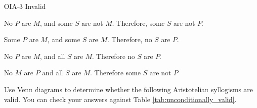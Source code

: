 \begin{exercises}
{ OIA-3 Invalid
}

\item No $P$ are $M$, and some $S$ are not $M$. Therefore, some $S$ are not $P$.

\item Some $P$ are $M$, and some $S$ are $M$. Therefore, no $S$ are $P$.

\item No $P$ are $M$, and all $S$ are $M$. Therefore no $S$ are $P$.
\item No $M$ are $P$ and all $S$ are $M$. Therefore some $S$ are not $P$
\end{exercises}

\noindent \problempart Use Venn diagrams to determine whether the following Aristotelian syllogisms are valid. You can check your answers against Table \ref{tab:unconditionally_valid}.

